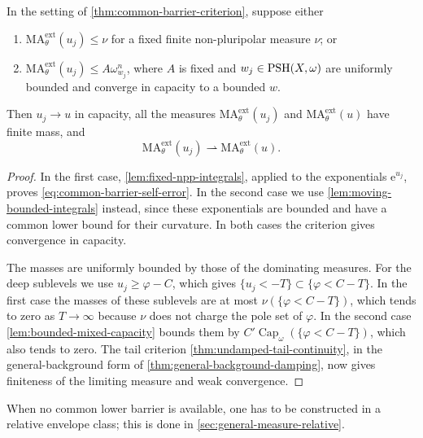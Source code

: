 \begin{corollary}\label{cor:common-barrier-continuity}
In the setting of \cref{thm:common-barrier-criterion}, suppose either
\begin{enumerate}
\item $\mathrm{MA}^{\mathrm{ext}}_\theta(u_j)\leq\nu$ for a fixed finite non-pluripolar measure $\nu$; or
\item $\mathrm{MA}^{\mathrm{ext}}_\theta(u_j)\leq A\omega_{w_j}^n$, where $A$ is fixed and $w_j\in\mathrm{PSH}(X,\omega)$ are uniformly bounded and converge in capacity to a bounded $w$.
\end{enumerate}
Then $u_j\to u$ in capacity, all the measures $\mathrm{MA}^{\mathrm{ext}}_\theta(u_j)$ and $\mathrm{MA}^{\mathrm{ext}}_\theta(u)$ have finite mass, and
\[
 \mathrm{MA}^{\mathrm{ext}}_\theta(u_j)
 \rightharpoonup\mathrm{MA}^{\mathrm{ext}}_\theta(u).
\]
\end{corollary}
\begin{proof}
In the first case, \cref{lem:fixed-npp-integrals}, applied to the exponentials $\mathrm{e}^{u_j}$, proves \eqref{eq:common-barrier-self-error}. In the second case we use \cref{lem:moving-bounded-integrals} instead, since these exponentials are bounded and have a common lower bound for their curvature. In both cases the criterion gives convergence in capacity.

The masses are uniformly bounded by those of the dominating measures. For the deep sublevels we use $u_j\geq\varphi-C$, which gives $\{u_j<-T\}\subset\{\varphi<C-T\}$. In the first case the masses of these sublevels are at most $\nu(\{\varphi<C-T\})$, which tends to zero as $T\to\infty$ because $\nu$ does not charge the pole set of $\varphi$. In the second case \cref{lem:bounded-mixed-capacity} bounds them by $C'\operatorname{Cap}_\omega(\{\varphi<C-T\})$, which also tends to zero. The tail criterion \cref{thm:undamped-tail-continuity}, in the general-background form of \cref{thm:general-background-damping}, now gives finiteness of the limiting measure and weak convergence.
\end{proof}

When no common lower barrier is available, one has to be constructed in a relative envelope class; this is done in \cref{sec:general-measure-relative}.
